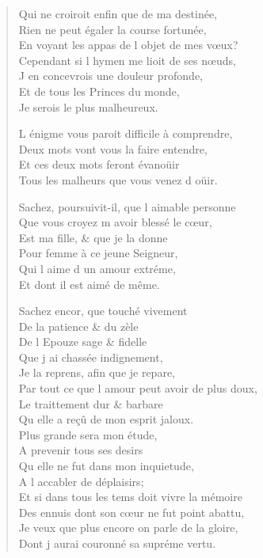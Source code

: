 \begin{verse}
Qui ne croiroit enfin que de ma destinée, \\
Rien ne peut égaler la course fortunée, \\
En voyant les appas de l\textquotesingle{} objet de mes vœux? \\
Cependant si l\textquotesingle{} hymen me lioit de ses nœuds, \\
\vin J\textquotesingle{} en concevrois une douleur profonde, \\
\vin Et de tous les Princes du monde, \\
\vin Je serois le plus malheureux.

L\textquotesingle{} énigme vous paroit difficile à comprendre, \\
\vin Deux mots vont vous la faire entendre, \\
\vin Et ces deux mots feront évanoüir \\
\vin Tous les malheurs que vous venez d\textquotesingle{} oüir.

Sachez, poursuivit-il, que l\textquotesingle{} aimable personne \\
\vin Que vous croyez m\textquotesingle{} avoir blessé le cœur, \\
\vin Est ma fille, \& que je la donne \\
\vin Pour femme à ce jeune Seigneur, \\
\vin Qui l\textquotesingle{} aime d\textquotesingle{} un amour extréme, \\
\vin Et dont il est aimé de même.

\vin Sachez encor, que touché vivement \\
\vin De la patience \& du zèle \\
\vin De l\textquotesingle{} Epouze sage \& fidelle \\
\vin Que j\textquotesingle{} ai chassée indignement, \\
\vin Je la reprens, afin que je repare, \\
Par tout ce que l\textquotesingle{} amour peut avoir de plus doux, \\
\vin Le traittement dur \& barbare \\
\vin Qu\textquotesingle{} elle a reçû de mon esprit jaloux. \\
\vin Plus grande sera mon étude, \\
\vin A prevenir tous ses desirs \\
\vin Qu\textquotesingle{} elle ne fut dans mon inquietude, \\
\vin A l\textquotesingle{} accabler de déplaisirs; \\
Et si dans tous les tems doit vivre la mémoire \\
Des ennuis dont son cœur ne fut point abattu, \\
Je veux que plus encore on parle de la gloire, \\
Dont j\textquotesingle{} aurai couronné sa supréme vertu.


\end{verse}
